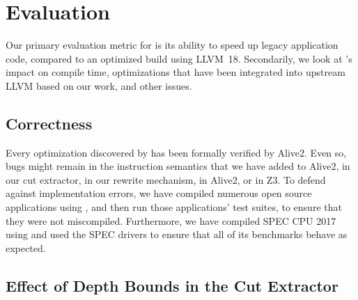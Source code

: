 \section{Evaluation}
\label{sec:evaluation}

Our primary evaluation metric for \minotaur{} is its ability to speed up
legacy application code, compared to an optimized build using LLVM~18.
%
Secondarily, we look at \minotaur's impact on compile time, optimizations
that have been integrated into upstream LLVM based on our work, and
other issues.


\subsection{Correctness}

Every optimization discovered by \minotaur{} has been formally verified by
Alive2.
%
Even so, bugs might remain in the instruction semantics that we have
added to Alive2, in our cut extractor, in our rewrite mechanism, in
Alive2, or in Z3\@.
%
To defend against implementation errors, we have compiled numerous
open source applications using \minotaur, and then run those applications'
test suites, to ensure that they were not miscompiled.
%
Furthermore, we have compiled SPEC CPU 2017 using \minotaur{} and
used the SPEC drivers to ensure that all of its benchmarks behave
as expected.


\subsection{Effect of Depth Bounds in the Cut Extractor}
\label{sec:loops}




